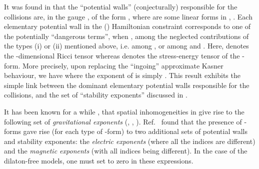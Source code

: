 \documentclass[a4paper,12pt]{article}
\begin{document}
It was found in
\cite{dh1,dh2} that the ``potential walls'' (conjecturally)
responsible for the collisions are, in the gauge \coordHE{}, of
the form \coordHE{}, where \coordHE{} are some linear forms in \coordHE{},
\myHighlight{$\beta^0 \equiv \varphi$}\coordHE{}. Each elementary potential wall \coordHE{} in the (\coordHE{})
Hamiltonian constraint corresponds to one of the potentially
``dangerous terms'', when \coordHE{}, among the neglected
contributions of the types (i) or (ii) mentioned above, i.e. among
\coordHE{}, or among \coordHE{} and \coordHE{}.  Here, \coordHE{} denotes the
\coordHE{}-dimensional Ricci tensor whereas
\coordHE{} denotes the stress-energy
tensor of the \coordHE{}-form. More precisely, upon replacing the
``ingoing'' approximate Kasner behaviour, we have \coordHE{} where the exponent of \coordHE{} is
simply \coordHE{}. This
result exhibits the simple link between the dominant elementary
potential walls \coordHE{} responsible for the collisions, and the set of
``stability exponents'' \coordHE{} discussed in \cite{dh1}. 

It has been known for a while
\cite{BKL}, \cite{DHS} that spatial inhomogeneities in \coordHE{}
give rise to the following set of {\it gravitational exponents} 
\coordHE{} 
(\coordHE{}, \coordHE{}, \coordHE{}). 
Ref.~\cite{dh1} found that the presence of \coordHE{}-forms gave rise (for 
each type of \coordHE{}-form) to two additional sets of potential walls
and stability 
exponents: the {\it electric exponents}
\coordHE{}
(where all the indices \coordHE{} are different) and the {\it magnetic 
exponents}
\coordHE{} 
(with all indices \coordHE{} being different). In the case of the 
dilaton-free models,
one must set \coordHE{} to zero 
in these expressions.
\end{document}
